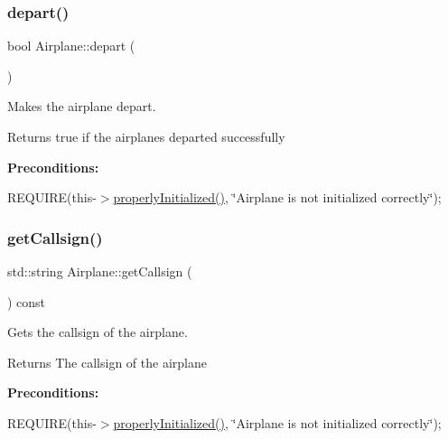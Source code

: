 \subsubsection{\texorpdfstring{depart()}{depart()}}
{\footnotesize\ttfamily bool Airplane\+::depart (\begin{DoxyParamCaption}{ }\end{DoxyParamCaption})}



Makes the airplane depart. 

\begin{DoxyReturn}{Returns}
true if the airplanes departed successfully
\end{DoxyReturn}
{\bfseries Preconditions\+:}
\begin{DoxyItemize}
\item R\+E\+Q\+U\+I\+RE(this-\/$>$\mbox{\hyperlink{class_airplane_a6f80df8f692cc8d67d292c1e9f26d59e}{properly\+Initialized()}}, \char`\"{}\+Airplane is not initialized correctly\char`\"{}); 
\end{DoxyItemize}\mbox{\label{class_airplane_af7e30dcc3191147869b0208edf7000c5}} 
\subsubsection{\texorpdfstring{get\+Callsign()}{getCallsign()}}
{\footnotesize\ttfamily std\+::string Airplane\+::get\+Callsign (\begin{DoxyParamCaption}{ }\end{DoxyParamCaption}) const}



Gets the callsign of the airplane. 

\begin{DoxyReturn}{Returns}
The callsign of the airplane
\end{DoxyReturn}
{\bfseries Preconditions\+:}
\begin{DoxyItemize}
\item R\+E\+Q\+U\+I\+RE(this-\/$>$\mbox{\hyperlink{class_airplane_a6f80df8f692cc8d67d292c1e9f26d59e}{properly\+Initialized()}}, \char`\"{}\+Airplane is not initialized correctly\char`\"{}); 
\end{DoxyItemize}\mbox{\label{class_airplane_aedac81e80b724d61d1c9df7311067ba8}} 
